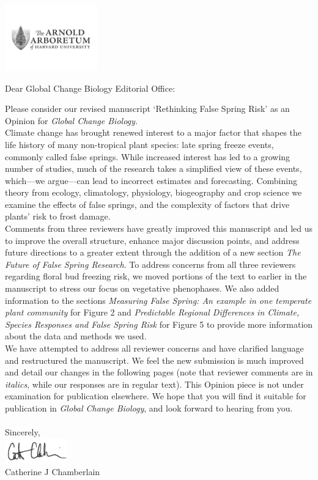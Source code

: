 \documentclass[11pt,a4paper]{letter}\usepackage[]{graphicx}\usepackage[]{color}
\begin{document}
\begin{letter}{}
\includegraphics[width=0.3\textwidth]{AA_logo.jpg}

\opening{Dear Global Change Biology Editorial Office:}

\noindent Please consider our revised manuscript `Rethinking False Spring Risk' as an Opinion for \emph{Global Change Biology.} 
\vspace{1.5ex}\\
Climate change has brought renewed interest to a major factor that shapes the life history of many non-tropical plant species: late spring freeze events, commonly called false springs. While increased interest has led to a growing number of studies, much of the research takes a simplified view of these events, which---we argue---can lead to incorrect estimates and forecasting. Combining theory from ecology, climatology, physiology, biogeography and crop science we examine the effects of false springs, and the complexity of factors that drive plants' risk to frost damage.
\vspace{1.5ex}\\
Comments from three reviewers have greatly improved this manuscript and led us to improve the overall structure, enhance major discussion points, and address future directions to a greater extent through the addition of a new section \textit{The Future of False Spring Research}. To address concerns from all three reviewers regarding floral bud freezing risk, we moved portions of the text to earlier in the manuscript to stress our focus on vegetative phenophases. We also added information to the sections \emph{Measuring False Spring: An example in one temperate plant community} for Figure 2 and \emph{Predictable Regional Differences in Climate, Species Responses and False Spring Risk} for Figure 5 to provide more information about the data and methods we used.
\vspace{1.5ex}\\
We have attempted to address all reviewer concerns and have clarified language and restructured the manuscript. We feel the new submission is much improved and detail our changes in the following pages (note that reviewer comments are in \emph{italics}, while our responses are in regular text). This Opinion piece is not under examination for publication elsewhere. We hope that you will find it suitable for publication in \emph{Global Change Biology}, and look forward to hearing from you.
\\\vspace{-1ex}\\
\noindent Sincerely,\\

 \includegraphics[width=0.2\textwidth]{Full_Signature.jpg} \\
 

\noindent Catherine J Chamberlain


\end{letter}
\end{document}
